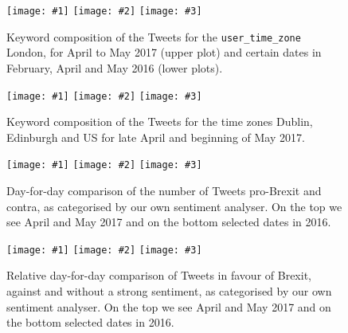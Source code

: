 \documentclass{emulateapj}
\makeatletter
\newcommand\plotthree[3]{ %
  \centering
  \leavevmode
  \setlength{\plot@width}{0.3\linewidth}
  \texttt{[image: \#1]}%
  \hfill
  \texttt{[image: \#2]}%
  \hfill
  \texttt{[image: \#3]}%
}%
\makeatother
\begin{document}
\begin{appendix}
\begin{figure}
  \plotthree{./img/feb16/frequency_stacked_London.pdf}{./img/apr16/frequency_stacked_London}{./img/may16/frequency_stacked_London}
  \caption{Keyword composition of the Tweets for the \texttt{user\_time\_zone} London, for April to May 2017 (upper plot) and certain dates in February, April 
  and May 2016 (lower plots).\label{fig:freqlondon}}
  \plotthree{./img/frequency_stacked_Dublin.pdf}{./img/frequency_stacked_Edinburgh.pdf}{./img/frequency_stacked_US.pdf}
  \caption{Keyword composition of the Tweets for the time zones Dublin, Edinburgh and US for late April and beginning of May 2017.\label{fig:freqmany}}
\end{figure}

\begin{figure}
  \plotthree{./img/feb16/total_daycount_ls.pdf}{./img/apr16/total_daycount_ls.pdf}{./img/may16/total_daycount_ls.pdf}
  \caption{Day-for-day comparison of the number of Tweets pro-Brexit and contra, as categorised by our own sentiment analyser.
           On the top we see April and May 2017 and on the bottom selected dates in 2016.
  \label{fig:totcount}}
\end{figure}

\begin{figure}
  \plotthree{./img/feb16/relative_daycount.pdf}{./img/apr16/relative_daycount.pdf}{./img/may16/relative_daycount.pdf}
  \caption{Relative day-for-day comparison of Tweets in favour of Brexit, against and without a strong sentiment, as categorised by our own sentiment analyser.
           On the top we see April and May 2017 and on the bottom selected dates in 2016.\label{fig:relcount}}
\end{figure}

\end{appendix}
\end{document}
